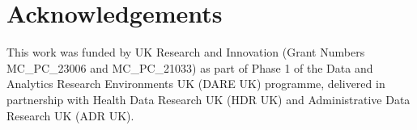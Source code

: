 \section*{Acknowledgements}

This work was funded by UK Research and Innovation (Grant Numbers MC\_PC\_23006 and MC\_PC\_21033) as part of Phase 1 of the Data and Analytics Research Environments UK (DARE UK) programme, delivered in partnership with Health Data Research UK (HDR UK) and Administrative Data Research UK (ADR UK).
